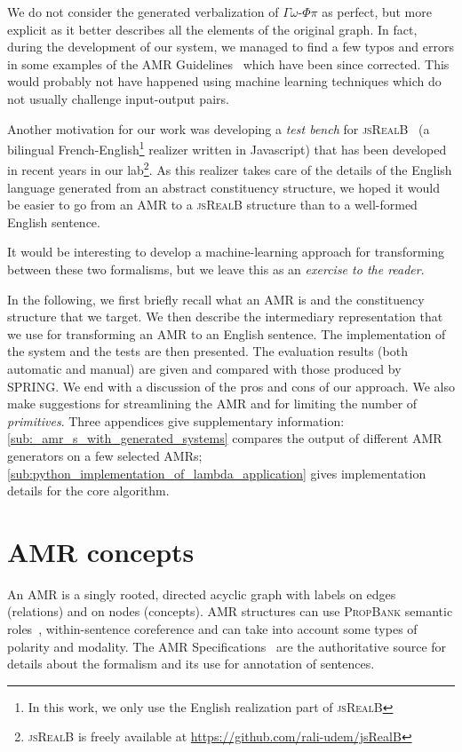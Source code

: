 \documentclass[12pt]{article}
\newcommand{\systeme}[1]{\textsc{#1}}
\newcommand{\jsr}{\systeme{jsRealB}}
\newcommand{\propbank}{\systeme{PropBank}}
\newcommand{\gophipy}{$\Gamma\omega$-$\Phi\pi$}
\newcommand{\spring}{\systeme{SPRING}}
\newcommand{\representation}[1]{\textsf{#1}}
\newcommand{\AMR}{\representation{AMR}}
\begin{document}
We do not consider the generated verbalization of \gophipy{} as perfect, but more explicit as it better describes all the elements of the original graph. In fact, during the development of our system, we managed to find a few typos and errors in some examples of the \AMR{} Guidelines~\cite{AMR-Guidelines} which have been since corrected. This would probably not have happened using machine learning techniques which do not usually challenge input-output pairs.

Another motivation for our work was developing a \emph{test bench} for \jsr{}~\cite{Molins2015ENLG} (a bilingual French-English\footnote{In this work, we only use the English realization part of \jsr{}} realizer written in Javascript) that has been developed in recent years in our lab\footnote{\jsr{} is freely available at \url{https://github.com/rali-udem/jsRealB}}. As this realizer takes care of the details of the English language generated from an abstract constituency structure, we hoped it would be easier to go from an \AMR{} to a \jsr{} structure than to a well-formed English sentence. 

It would be interesting to develop a machine-learning approach for transforming between these two formalisms, but we leave this as an \emph{exercise to the reader}. 

In the following, we first briefly recall what an \AMR{} is and the constituency structure that we target. We then describe the intermediary representation that we use for transforming an \AMR{} to an English sentence. The implementation of the system and the tests are then presented. The evaluation results (both automatic and manual) are given and compared with those produced by \spring{}. We end with a discussion of the pros and cons of our approach. We also make suggestions for streamlining the \AMR{} and for limiting the number of \emph{primitives}. Three appendices give supplementary information: \ref{sub:_amr_s_with_generated_systems} compares the output of different \AMR{} generators on a few selected \AMR{}s; 
\ref{sub:python_implementation_of_lambda_application} gives implementation details for the core algorithm. %

\section{\AMR{} concepts} %
\label{sec:amr_concepts}
An \AMR{} is a singly rooted, directed acyclic graph with labels on edges (relations) and on nodes (concepts). \AMR{} structures can use \propbank{} semantic roles~\cite{L14-1011}, within-sentence coreference and can take into account some types of polarity and modality. The \AMR{} Specifications~\cite{AMR-Guidelines} are the authoritative source for details about the formalism and its use for annotation of sentences.
\end{document}
